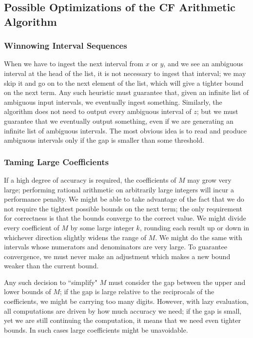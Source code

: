 \documentclass[11pt, oneside]{amsart}   	%
\begin{document}
\subsection{Possible Optimizations of the CF Arithmetic Algorithm}
\subsubsection{Winnowing Interval Sequences}
When we have to ingest the next interval from $x$ or $y$, and we see an ambiguous interval at the head of the list, it is not necessary
to ingest that interval; we may skip it and go on to the next element of the list, which will give a tighter bound on the next term.
Any such heuristic must guarantee that, given an infinite list of ambiguous input intervals, we eventually ingest something. Similarly, the
algorithm does not need to output every ambiguous interval of $z$; but  we must guarantee that we eventually output something,
even if we are generating an infinite list of ambiguous intervals. The most obvious idea is to read and produce ambiguous intervals only if the gap is smaller than some threshold.

\subsubsection{Taming Large Coefficients}
If a high degree of accuracy is required, the coefficients of $M$ may grow very large; performing rational arithmetic on arbitrarily
large integers will incur a performance penalty. We might be able to take advantage of the fact that we do not require the tightest
possible bounds on the next term; the only requirement for correctness is that the bounds converge to the correct value. We might
divide every coefficient of $M$ by some large integer $k$, rounding each result up or down in whichever direction slightly widens the
range of $M$. We might do the same with intervals whose numerators and denominators are very large. To guarantee convergence,
we must never make an adjustment which makes a new bound weaker than the current bound.

Any such decision to ``simplify" $M$ must consider the gap between the upper and lower bounds of $M$; if the gap is large relative
to the reciprocals of the coefficients, we might be carrying too many digits. However, with lazy evaluation, all computations
are driven by how much accuracy we need; if the gap is small, yet we are still continuing the computation, it means that we need
even tighter bounds. In such cases large coefficients might be unavoidable.
\end{document}
